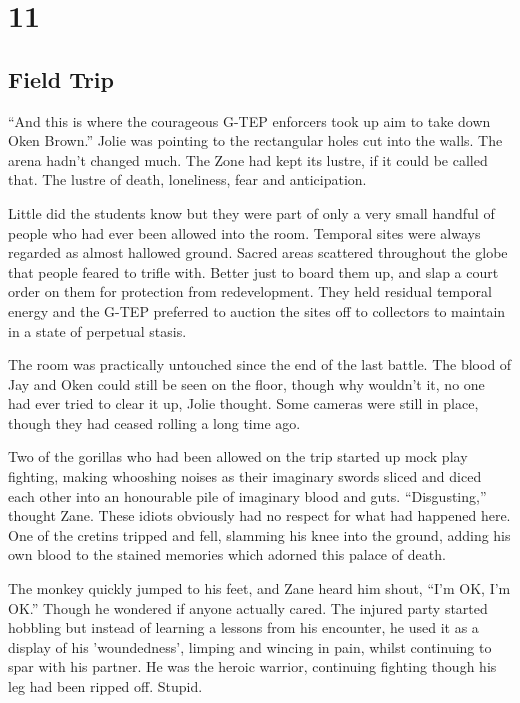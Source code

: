 \chapter{11}
\section{Field Trip}


``And this is where the courageous G-TEP enforcers took up aim to take down Oken Brown.''  Jolie was pointing to the rectangular holes cut into the walls.  The arena hadn't changed much.  The Zone had kept its lustre, if it could be called that.  The lustre of death, loneliness, fear and anticipation.  

Little did the students know but they were part of only a very small handful of people who had ever been allowed into the room.  Temporal sites were always regarded as almost hallowed ground.  Sacred areas scattered throughout the globe that people feared to trifle with.  Better just to board them up, and slap a court order on them for protection from redevelopment.  They held residual temporal energy and the G-TEP preferred to auction the sites off to collectors to maintain in a state of perpetual stasis.

The room was practically untouched since the end of the last battle.  The blood of Jay and Oken could still be seen on the floor, though why wouldn't it, no one had ever tried to clear it up, Jolie thought.  Some cameras were still in place, though they had ceased rolling a long time ago.

Two of the gorillas who had been allowed on the trip started up mock play fighting, making whooshing noises as their imaginary swords sliced and diced each other into an honourable pile of imaginary blood and guts.  ``Disgusting,'' thought Zane.  These idiots obviously had no respect for what had happened here.  One of the cretins tripped and fell, slamming his knee into the ground, adding his own blood to the stained memories which adorned this palace of death.  

The monkey quickly jumped to his feet, and Zane heard him shout, ``I'm OK, I'm OK.''  Though he wondered if anyone actually cared.  The injured party started hobbling but instead of learning a lessons from his encounter, he used it as a display of his 'woundedness', limping and wincing in pain, whilst continuing to spar with his partner.  He was the heroic warrior, continuing fighting though his leg had been ripped off.  Stupid.

